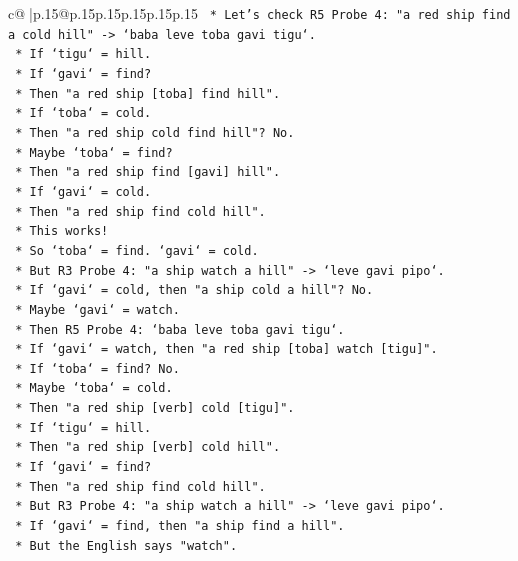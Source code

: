 \documentclass{article}
\begin{document}
{\begin{supertabular}{c@{$\;$}|p{.15\linewidth}@{}p{.15\linewidth}p{.15\linewidth}p{.15\linewidth}p{.15\linewidth}p{.15\linewidth}}
{{{\texttt{        *   Let's check R5 Probe 4: "a red ship find a cold hill" {-}> `baba leve toba gavi tigu`.} \\
\texttt{        *   If `tigu` = hill.} \\
\texttt{        *   If `gavi` = find?} \\
\texttt{        *   Then "a red ship {[}toba{]} find hill".} \\
\texttt{        *   If `toba` = cold.} \\
\texttt{        *   Then "a red ship cold find hill"? No.} \\
\texttt{        *   Maybe `toba` = find?} \\
\texttt{        *   Then "a red ship find {[}gavi{]} hill".} \\
\texttt{        *   If `gavi` = cold.} \\
\texttt{        *   Then "a red ship find cold hill".} \\
\texttt{        *   This works!} \\
\texttt{        *   So `toba` = find. `gavi` = cold.} \\
\texttt{        *   But R3 Probe 4: "a ship watch a hill" {-}> `leve gavi pipo`.} \\
\texttt{        *   If `gavi` = cold, then "a ship cold a hill"? No.} \\
\texttt{        *   Maybe `gavi` = watch.} \\
\texttt{        *   Then R5 Probe 4: `baba leve toba gavi tigu`.} \\
\texttt{        *   If `gavi` = watch, then "a red ship {[}toba{]} watch {[}tigu{]}".} \\
\texttt{        *   If `toba` = find? No.} \\
\texttt{        *   Maybe `toba` = cold.} \\
\texttt{        *   Then "a red ship {[}verb{]} cold {[}tigu{]}".} \\
\texttt{        *   If `tigu` = hill.} \\
\texttt{        *   Then "a red ship {[}verb{]} cold hill".} \\
\texttt{        *   If `gavi` = find?} \\
\texttt{        *   Then "a red ship find cold hill".} \\
\texttt{        *   But R3 Probe 4: "a ship watch a hill" {-}> `leve gavi pipo`.} \\
\texttt{        *   If `gavi` = find, then "a ship find a hill".} \\
\texttt{        *   But the English says "watch".} \\
}}}
\end{supertabular}}
\end{document}
